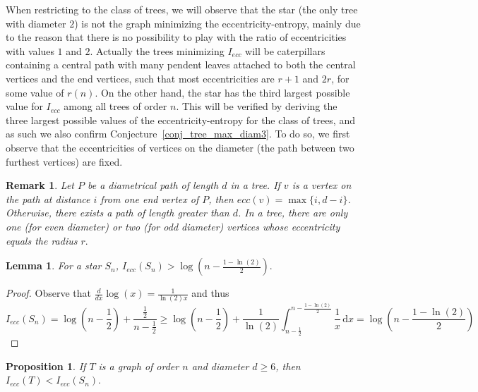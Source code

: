\documentclass{article}
\newtheorem{lem}[defi]{Lemma}
\newtheorem{prop}[defi]{Proposition}
\newtheorem{remark}[defi]{Remark}
\def \d{\, \mathrm{d}}
\newcommand{\ecc}{ecc}
\begin{document}
{When restricting to the class of trees, we will observe that the star (the only tree with diameter $2$) is not the graph minimizing the eccentricity-entropy, mainly due to the reason that there is no possibility to play with the ratio of eccentricities with values $1$ and $2$. Actually the trees minimizing $I_{\ecc}$ will be caterpillars containing a central path with many pendent leaves attached to both the central vertices and the end vertices, such that most eccentricities are $r+1$ and $2r$, for some value of $r(n)$. 
On the other hand, the star has the third largest possible value for $I_{\ecc}$ among all trees of order $n$. This will be verified by deriving the three largest possible values of the eccentricity-entropy for the class of trees, and as such we also confirm Conjecture~\ref{conj_tree_max_diam3}.
To do so, we first observe that the eccentricities of vertices on the diameter (the path between two furthest vertices) are fixed.

\begin{remark}\label{rem:fixedecc_onpath}
    Let $P$ be a diametrical path of length $d$ in a tree. If $v$ is a vertex on the path at distance $i$ from one end vertex of $P$, then $\ecc(v)=\max\{i,d-i\}$. Otherwise, there exists a path of length greater than $d$.
    In a tree, there are only one (for even diameter) or two (for odd diameter) vertices whose eccentricity equals the radius $r.$
\end{remark}

\begin{lem}\label{lem:Iecc(Sn)}
    For a star $S_n$, $I_{\ecc}(S_n)>\log\left(n-\frac {1-\ln(2)}{2}\right).$
\end{lem}
\begin{proof}
    Observe that %
    $\frac{d}{dx} \log(x) = \frac{1}{ \ln(2) x}$ and thus
\begin{equation*}
    I_{\ecc}(S_n)=\log\left(n-\frac 12\right) + \frac{\frac 12 }{n-\frac 12}\ge 
        \log\left(n-\frac 12\right) + \frac1{\ln(2)} \int_{n-\frac 12}^{n-\frac {1-\ln(2)}{2} } 
        \frac{1}{x} \d x= \log\left(n-\frac {1-\ln(2)}{2}\right)
\end{equation*} 
\end{proof}

\begin{prop}\label{prop:over6_less_star}
If $T$ is a graph of order $n$ and diameter $d \ge 6$, then $I_{\ecc}(T)<I_{\ecc}(S_n).$ 
\end{prop}

}
\end{document}
